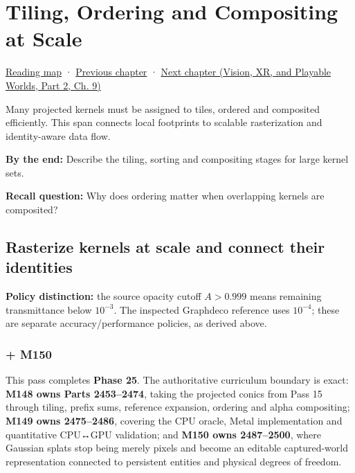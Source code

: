 \chapter{Tiling, Ordering and Compositing at Scale}\label{04-visual-computing-ii-ch039-tiling-ordering-and-compositing-at-scale}\hypertarget{04-visual-computing-ii-ch039}{}\label{stagechapter:04-visual-computing-ii-ch039}

\hypertarget{04-visual-computing-ii-ch039-tiling-ordering-and-compositing-at-scale}{}

\hyperref[volume-reading-map]{Reading map} · \hyperref[04-visual-computing-ii-ch038-projecting-ellipsoids-into-screen-space-conics]{Previous chapter} · \href{../07-Vision-XR-and-Playable-Worlds-P02/main.pdf\#nameddest=04-visual-computing-ii-ch042}{Next chapter (Vision, XR, and Playable Worlds, Part 2, Ch. 9)}

Many projected kernels must be assigned to tiles, ordered and composited efficiently. This span connects local footprints to scalable rasterization and identity-aware data flow.

\textbf{By the end:} Describe the tiling, sorting and compositing stages for large kernel sets.

\textbf{Recall question:} Why does ordering matter when overlapping kernels are composited?

\section{Rasterize kernels at scale and connect their identities}\label{04-visual-computing-ii-ch039-rasterize-kernels-at-scale-and-connect-their-identities}

\hypertarget{04-visual-computing-ii-ch039-rasterize-kernels-at-scale-and-connect-their-identities}{}

\textbf{Policy distinction:} the source opacity cutoff \(A>0.999\) means remaining transmittance below \(10^{-3}\). The inspected Graphdeco reference uses \(10^{-4}\); these are separate accuracy/performance policies, as derived above.

\subsection{+ M150}\label{04-visual-computing-ii-ch039-m150}

\hypertarget{04-visual-computing-ii-ch039-m150}{}

This pass completes \textbf{Phase 25}. The authoritative curriculum boundary is exact: \textbf{M148 owns Parts 2453--2474}, taking the projected conics from Pass 15 through tiling, prefix sums, reference expansion, ordering and alpha compositing; \textbf{M149 owns 2475--2486}, covering the CPU oracle, Metal implementation and quantitative CPU↔GPU validation; and \textbf{M150 owns 2487--2500}, where Gaussian splats stop being merely pixels and become an editable captured-world representation connected to persistent entities and physical degrees of freedom.

